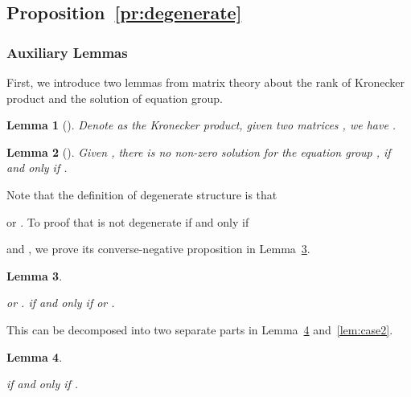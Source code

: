 \documentclass[10pt,journal,compsoc]{IEEEtran}
\newtheorem{lemma}{Lemma}
\begin{document}
\subsection{Proposition~\ref{pr:degenerate}}
\label{app:degenerate}

\subsubsection{Auxiliary Lemmas}


First,
we introduce two lemmas from matrix theory about the rank of Kronecker product
and the solution of equation group.

\begin{lemma}[\cite{horn2012matrix}]
\label{lem:kron}
Denote  as the Kronecker product,
given two matrices , we have
.
\end{lemma}

\begin{lemma}[\cite{horn2012matrix}]
\label{lem:zero}
Given ,
there is no non-zero solution  for
the equation group ,
if and only if .
\end{lemma}

Note that the definition of degenerate structure 
 is that
	
	or 
	.
To proof that  is not degenerate if and only if 

and
,
we prove its converse-negative proposition
in Lemma~\ref{lem:con-neg}.

\begin{lemma}
	\label{lem:con-neg}
	
	or 
	.
	if and only if
	 or .
\end{lemma}

This can be decomposed into two separate parts
in Lemma~\ref{lem:case1} and~\ref{lem:case2}.


\begin{lemma}
\label{lem:case1}

if and only if .
\end{lemma}
\end{document}
